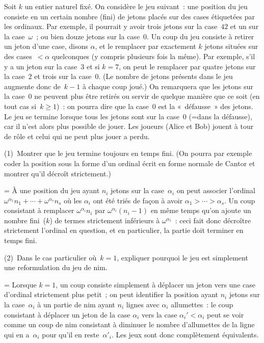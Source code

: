 \documentclass[12pt,a4paper]{article}
\theoremstyle{definition}
\newif\ifcorrige
\newenvironment{corrige}%
{\ifcorrige\relax\else\setbox0=\vbox\bgroup\fi%
\smallbreak\noindent{\underbar{\textit{Corrigé.}}\quad}}
{{\hbox{}\nobreak\hfill\checkmark}%
\ifcorrige\relax\else\egroup\fi\par}
\begin{document}
Soit $k$ un entier naturel fixé.  On considère le jeu suivant : une
position du jeu consiste en un certain nombre (fini) de jetons placés
sur des cases étiquetées par les ordinaux.  Par exemple, il pourrait y
avoir trois jetons sur la case $42$ et un sur la case $\omega$ ; ou
bien douze jetons sur la case $0$.  Un coup du jeu consiste à retirer
un jeton d'une case, disons $\alpha$, et le remplacer par exactement
$k$ jetons situées sur des cases $<\alpha$ quelconques (y compris
plusieurs fois la même).  Par exemple, s'il y a un jeton sur la
case $3$ et si $k=7$, on peut le remplacer par quatre jetons sur la
case $2$ et trois sur la case $0$.  (Le nombre de jetons présents dans
le jeu augmente donc de $k-1$ à chaque coup joué.)  On remarquera que
les jetons sur la case $0$ ne peuvent plus être retirés ou servir de
quelque manière que ce soit (en tout cas si $k\geq 1$) : on pourra
dire que la case $0$ est la « défausse » des jetons.  Le jeu se
termine lorsque tous les jetons sont sur la case $0$ (=dans la
défausse), car il n'est alors plus possible de jouer.  Les joueurs
(Alice et Bob) jouent à tour de rôle et celui qui ne peut plus jouer a
perdu.

(1) Montrer que le jeu termine toujours en temps fini.  (On pourra par
exemple coder la position sous la forme d'un ordinal écrit en forme
normale de Cantor et montrer qu'il décroît strictement.)

\begin{corrige}
À une position du jeu ayant $n_i$ jetons sur la case $\alpha_i$ on
peut associer l'ordinal $\omega^{\alpha_1} n_1 + \cdots +
\omega^{\alpha_s} n_s$ où les $\alpha_i$ ont été triés de façon à
avoir $\alpha_1 > \cdots > \alpha_s$.  Un coup consistant à remplacer
$\omega^{\alpha_i} n_i$ par $\omega^{\alpha_i} (n_i-1)$ en même temps
qu'on ajoute un nombre fini ($k$) de termes strictement inférieurs à
$\omega^{\alpha_i}$ : ceci fait donc décroître strictement l'ordinal
en question, et en particulier, la partie doit terminer en temps fini.
\end{corrige}

\smallbreak

(2) Dans le cas particulier où $k=1$, expliquer pourquoi le jeu est
simplement une reformulation du jeu de nim.

\begin{corrige}
Lorsque $k=1$, un coup consiste simplement à déplacer un jeton vers
une case d'ordinal strictement plus petit ; on peut identifier la
position ayant $n_i$ jetons sur la case $\alpha_i$ à un partie de nim
ayant $n_i$ lignes avec $\alpha_i$ allumettes : le coup consistant à
déplacer un jeton de la case $\alpha_i$ vers la case $\alpha_i' <
\alpha_i$ peut se voir comme un coup de nim consistant à diminuer le
nombre d'allumettes de la ligne qui en a $\alpha_i$ pour qu'il en
reste $\alpha'_i$.  Les jeux sont donc complètement équivalents.
\end{corrige}
\end{document}
